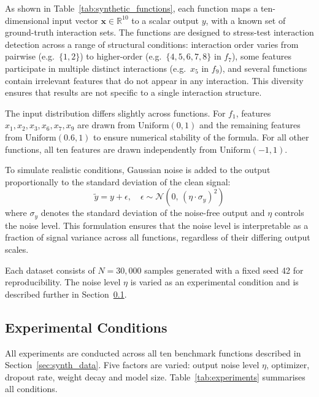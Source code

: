 \documentclass{article}
\begin{document}
As shown in Table~\ref{tab:synthetic_functions}, each function maps a 
ten-dimensional input vector $\mathbf{x} \in \mathbb{R}^{10}$ to a scalar 
output $y$, with a known set of ground-truth interaction sets. The functions 
are designed to stress-test interaction detection across a range of structural 
conditions: interaction order varies from pairwise (e.g.\ $\{1,2\}$) to 
higher-order (e.g.\ $\{4,5,6,7,8\}$ in $f_7$), some features participate in 
multiple distinct interactions (e.g.\ $x_5$ in $f_9$), and several functions 
contain irrelevant features that do not appear in any interaction. This 
diversity ensures that results are not specific to a single interaction 
structure.

The input distribution differs slightly across functions. For $f_1$, features 
$x_1, x_2, x_3, x_6, x_7, x_9$ are drawn from $\mathrm{Uniform}(0, 1)$ and 
the remaining features from $\mathrm{Uniform}(0.6, 1)$ to ensure numerical 
stability of the formula. For all other functions, all ten features are drawn 
independently from $\mathrm{Uniform}(-1, 1)$.

To simulate realistic conditions, Gaussian noise is added to the output 
proportionally to the standard deviation of the clean signal:
\begin{equation}
    \tilde{y} = y + \epsilon, \quad \epsilon \sim \mathcal{N}(0,\, 
    (\eta \cdot \sigma_y)^2)
\end{equation}
where $\sigma_y$ denotes the standard deviation of the noise-free output and 
$\eta$ controls the noise level. This formulation ensures that the noise level 
is interpretable as a fraction of signal variance across all functions, 
regardless of their differing output scales.

Each dataset consists of $N = 30{,}000$ samples generated with a fixed 
seed 42 for reproducibility. The noise level $\eta$ is varied as an experimental  condition and is described further in Section~\ref{sec:experiments}.

\subsection{Experimental Conditions}
\label{sec:experiments}
All experiments are conducted across all ten benchmark functions described 
in Section~\ref{sec:synth_data}. Five factors are varied: output noise level 
$\eta$, optimizer, dropout rate, weight decay and model size. Table~\ref{tab:experiments} 
summarises all conditions.
\end{document}
